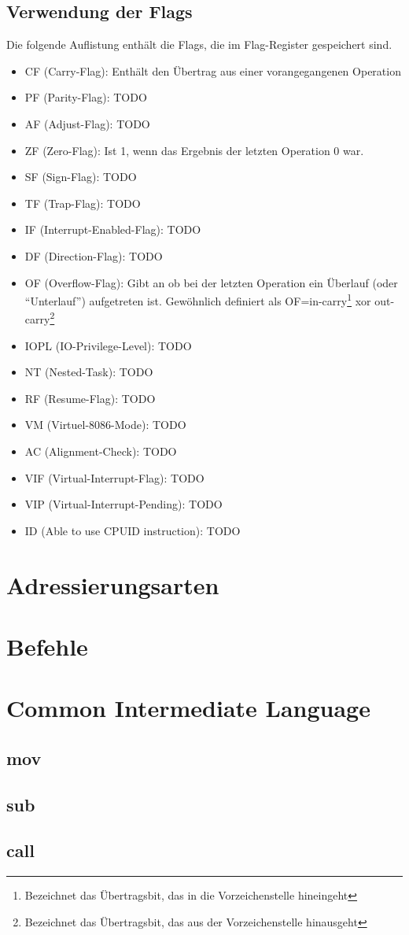 \subsection{Verwendung der Flags}
Die folgende Auflistung enthält die Flags, die im Flag-Register gespeichert sind.
\begin{itemize}
\item CF (Carry-Flag): Enthält den Übertrag aus einer vorangegangenen Operation
\item PF (Parity-Flag): TODO
\item AF (Adjust-Flag): TODO
\item ZF (Zero-Flag): Ist 1, wenn das Ergebnis der letzten Operation 0 war.
\item SF (Sign-Flag): TODO
\item TF (Trap-Flag): TODO
\item IF (Interrupt-Enabled-Flag): TODO
\item DF (Direction-Flag): TODO
\item OF (Overflow-Flag): Gibt an ob bei der letzten Operation ein Überlauf (oder \enquote{Unterlauf}) aufgetreten ist. Gewöhnlich definiert als OF=in-carry\footnote{Bezeichnet das Übertragsbit, das in die Vorzeichenstelle hineingeht} xor out-carry\footnote{Bezeichnet das Übertragsbit, das aus der Vorzeichenstelle hinausgeht}
\item IOPL (IO-Privilege-Level): TODO
\item NT (Nested-Task): TODO
\item RF (Resume-Flag): TODO
\item VM (Virtuel-8086-Mode): TODO
\item AC (Alignment-Check): TODO
\item VIF (Virtual-Interrupt-Flag): TODO
\item VIP (Virtual-Interrupt-Pending): TODO
\item ID (Able to use CPUID instruction): TODO
\end{itemize}
\section{Adressierungsarten}
\section{Befehle}
\section{Common Intermediate Language}
\subsection{mov}
\subsection{sub}
\subsection{call}
